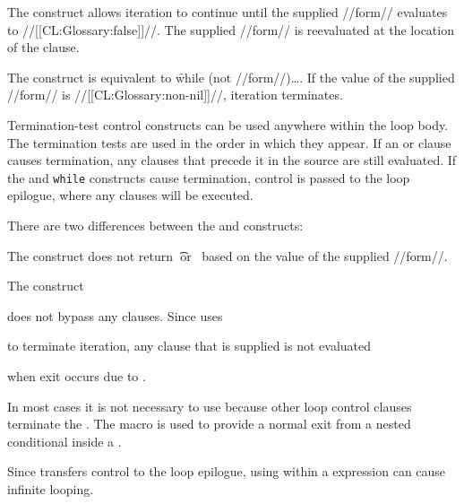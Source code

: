  
 
The  construct allows iteration to continue until the 
supplied //form// 
evaluates to //[[CL:Glossary:false]]//.  The supplied //form// 
is reevaluated at the location of the  clause.
 
The  construct is equivalent to 
\f{while (not //form//)\dots}.  If the value of the
supplied //form// is //[[CL:Glossary:non-nil]]//, iteration terminates.





Termination-test control constructs can be used anywhere within the loop body.
The termination tests are used in the order in which they appear.
If an  or  clause causes
termination, any clauses that precede it in the source
are still evaluated.  
If the  and {\tt while} constructs cause termination,
control is passed to the loop epilogue, where any 
clauses will be executed.  
 
There are two differences between the  and 
constructs: 
 
\beginlist
\itemitem{\bull} The  construct does not return 
\t\ or \nil\ based on the value of the supplied //form//.
                                                       
\itemitem{\bull} 
The  construct 

does not bypass any  clauses.
Since  uses 

to terminate iteration,
any  clause that is supplied is not evaluated

when exit occurs due to . 
\endlist










In most cases it is not necessary to use 
because other loop control clauses terminate the .  
The macro  is used to provide a normal exit
from a nested conditional inside a .





Since  transfers control to the loop epilogue,
using  within a  expression can cause
infinite looping.








